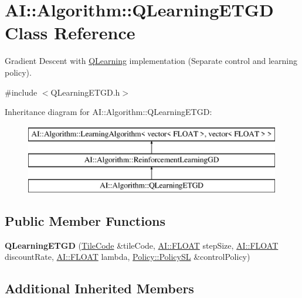 \hypertarget{classAI_1_1Algorithm_1_1QLearningETGD}{\section{A\+I\+:\+:Algorithm\+:\+:Q\+Learning\+E\+T\+G\+D Class Reference}
\label{classAI_1_1Algorithm_1_1QLearningETGD}
}


Gradient Descent with \hyperlink{classAI_1_1Algorithm_1_1QLearning}{Q\+Learning} implementation (Separate control and learning policy).  




{\ttfamily \#include $<$Q\+Learning\+E\+T\+G\+D.\+h$>$}

Inheritance diagram for A\+I\+:\+:Algorithm\+:\+:Q\+Learning\+E\+T\+G\+D\+:\begin{figure}[H]
\begin{center}
\leavevmode
\includegraphics[height=3.000000cm]{classAI_1_1Algorithm_1_1QLearningETGD}
\end{center}
\end{figure}
\subsection*{Public Member Functions}
\begin{DoxyCompactItemize}
\item 
\hypertarget{classAI_1_1Algorithm_1_1QLearningETGD_ae36fe58b069fb5f9b36f4e7a5b3c8e09}{{\bfseries Q\+Learning\+E\+T\+G\+D} (\hyperlink{classAI_1_1Algorithm_1_1TileCode}{Tile\+Code} \&tile\+Code, \hyperlink{namespaceAI_a41b74884a20833db653dded3918e05c3}{A\+I\+::\+F\+L\+O\+A\+T} step\+Size, \hyperlink{namespaceAI_a41b74884a20833db653dded3918e05c3}{A\+I\+::\+F\+L\+O\+A\+T} discount\+Rate, \hyperlink{namespaceAI_a41b74884a20833db653dded3918e05c3}{A\+I\+::\+F\+L\+O\+A\+T} lambda, \hyperlink{classAI_1_1Algorithm_1_1Policy_1_1Policy}{Policy\+::\+Policy\+S\+L} \&control\+Policy)}\label{classAI_1_1Algorithm_1_1QLearningETGD_ae36fe58b069fb5f9b36f4e7a5b3c8e09}

\end{DoxyCompactItemize}
\subsection*{Additional Inherited Members}


